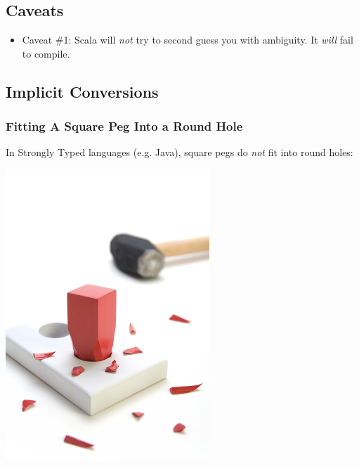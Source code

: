 \documentclass[xcolor=dvipsnames]{beamer}
\newenvironment{itemizeframe}
               {\begin{frame}\startitemizeframe} 
               {\stopitemizeframe\end{frame}}
\newcommand\startitemizeframe{\begin{itemize}} \newcommand\stopitemizeframe{\end{itemize}}
\begin{document}
\subsection{Caveats}
\begin{itemizeframe}
    \frametitle{Caveats of Implicits}
    \item Caveat \#1: Scala will {\em not} try to second guess you with ambiguity.  It {\em will} fail to compile.
        
        
\end{itemizeframe}

\subsection{Implicit Conversions}
\begin{frame}
    \frametitle{Fitting A Square Peg Into a Round Hole}
        In Strongly Typed languages (e.g. Java), square pegs do {\em not} fit into round holes:
        \begin{center}
        \includegraphics{images/square-peg-round-hole.jpg}
        \end{center}
\end{frame}
\end{document}
